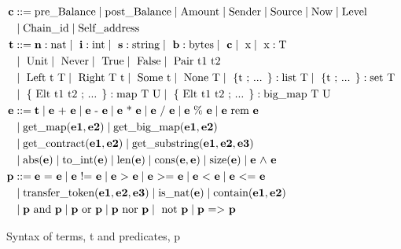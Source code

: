 \documentclass[a4paper,USenglish,cleveref, autoref, thm-restate]{lipics-v2021}
\begin{document}
\begin{figure}[tp]
\begin{align*}
\textbf{c} & ::= 
    \text{pre\_Balance}
   \mid \text{post\_Balance}
   \mid \text{Amount}
   \mid \text{Sender}
   \mid \text{Source} 
   \mid \text{Now}
   \mid \text{Level} \\
   &\mid \text{Chain\_id}
   \mid \text{Self\_address}\\
\textbf{t} &::= 
   \textbf{n}: \text{nat}
   \mid\ \textbf{i}: \text{int}
   \mid\  \textbf{s}: \text{string} 
   \mid\  \textbf{b}: \text{bytes}
   \mid\  \textbf{c}  
   \mid\  \text{x} 
   \mid\ \text{x}: \text{T} \\
   &\mid\ \text{Unit} 
   \mid\ \text{Never} 
   \mid\ \text{True} 
   \mid\ \text{False} 
   \mid\ \text{Pair}\ \text{t1 t2} \\
   &\mid\ \text{Left}\ \text{t}\  \text{T}
   \mid\ \text{Right}\ \text{T}\ \text{t}
   \mid\ \text{Some}\ \text{t}
   \mid\ \text{None}\ \text{T} 
   \mid\ \text{\{t ; ... \}}: \text{list T}
   \mid\ \text{\{t ; ... \}}: \text{set T} \\
   &\mid\ \text{\{ Elt t1 t2 ; ... \}}: \text{map T U}
   \mid\ \text{\{ Elt t1 t2 ; ... \}}: \text{big\_map T U} \\
\textbf{e} & :: = \textbf{t}  \mid \textbf{e} \text{ + } \textbf{e}\mid \textbf{e} \text{ - } \textbf{e}  \mid \textbf{e} \text{ * } \textbf{e} \mid \textbf{e} \text{ / } \textbf{e} \mid \textbf{e} \text{ \% } \textbf{e} \mid \textbf{e} \text{ rem } \textbf{e} \\
& 
 \mid \text{get\_map} (\textbf{e1}, \textbf{e2}) 
 \mid \text{get\_big\_map} (\textbf{e1}, \textbf{e2})  \\
 &\mid \text{get\_contract} (\textbf{e1}, \textbf{e2})   
 \mid \text{get\_substring} (\textbf{e1}, \textbf{e2}, \textbf{e3})   \\
& \mid \text{abs} (\textbf{e})  
 \mid \text{to\_int} (\textbf{e})  
 \mid \text{len} (\textbf{e})
 \mid \text{cons} (\textbf{e}, \textbf{e})
 \mid \text{size} (\textbf{e})
\mid \textbf{e} \text{ $\wedge$ } \textbf{e}  \\
\textbf{p} & :: = \textbf{e} \text{ = } \textbf{e}
\mid \textbf{e} \text{ != } \textbf{e}
\mid \textbf{e} \text{ > } \textbf{e}
\mid \textbf{e} \text{ >= } \textbf{e}
\mid \textbf{e} \text{ < } \textbf{e}
\mid \textbf{e} \text{ <= } \textbf{e} \\
& \mid \text{transfer\_token} (\textbf{e1}, \textbf{e2}, \textbf{e3})  
 \mid \text{is\_nat} (\textbf{e})  
 \mid \text{contain} (\textbf{e1}, \textbf{e2}) \\
& \mid \textbf{p} \text{ and } \textbf{p}\mid \textbf{p} \text{ or } \textbf{p}  \mid \textbf{p} \text{ nor } \textbf{p} \mid  \text{ not } \textbf{p} \mid \textbf{p} \text{ => } \textbf{p} \\
\end{align*}
\caption{Syntax of terms, t and predicates, p}
\label{fig:syntax-terms-predicates}
\end{figure}
\end{document}
